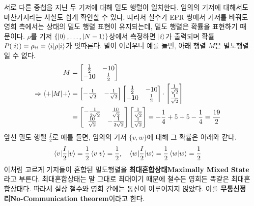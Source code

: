 \documentclass[a4paper,chapter,atbegshi]{oblivoir}
\begin{document}
서로 다른 중첩을 지닌 두 기저에 대해 밀도 행렬이 일치한다. 임의의
기저에 대해서도 마찬가지라는 사실도 쉽게 확인할 수 있다. 따라서 철수가
EPR 쌍에서 기저를 바꿔도 영희 측에서는 상태의 밀도 행렬 표현이 유지되는데,
밀도 행렬은 확률을 표현하기 때문이다. $\rho$를 기저 
$\{\ket0,\ldots,\ket{N-1}\}$상에서 측정하면 $\ket{i}$가
출력되며 확률 $P(\ket{i})=\rho_{ii}=\braket{i|\rho|i}$가 잇따른다. 말이 어려우니
예를 들면, 아래 행렬 $M$은 밀도행렬일 수 없다.
\begin{align*}
  M &= \begin{bmatrix}\frac{1}{2} &-10 \\ -10 &\frac{1}{2}\end{bmatrix}\\
  \Rightarrow\braket{+|M|+}&=
  \begin{bmatrix}-\frac{1}{\sqrt2}&-\frac{1}{\sqrt2}\end{bmatrix}
\begin{bmatrix}\frac{1}{2} &-10 \\ -10 &\frac{1}{2}\end{bmatrix}\cdot
\begin{bmatrix}\frac{1}{\sqrt2}\\\frac{1}{\sqrt2}\end{bmatrix}\\&=
  \begin{bmatrix}-\frac{1}{2\sqrt2}&\frac{10}{\sqrt2}\\
  \frac{10}{\sqrt2}&-\frac{1}{2\sqrt2}\end{bmatrix}
   \begin{bmatrix}\frac{1}{\sqrt2}\\\frac{1}{\sqrt2}\end{bmatrix}
   =-\frac{1}{4}+5+5-\frac{1}{4}=\frac{19}{2}
\end{align*}
앞선 밀도 행렬 $\frac{I}{2}$로 예를 들면, 임의의 기저 
$\{v,w\}$에 대해 그 확률은 아래와 같다.
\[
  \braket{v|\frac{I}{2}|v}=\frac{1}{2}\braket{v|v}=\frac{1}{2},\quad
  \braket{w|\frac{I}{2}|w}=\frac{1}{2}\braket{w|w}=\frac{1}{2}
\]
이처럼 고르게 기저들이 혼합된 밀도행렬을 \textbf{최대혼합상태\tiny Maximally Mixed
State}라고 부른다. 최대혼합상태는 말 그대로 최대이기 때문에 철수든 영희든
똑같은 최대혼합상태다. 따라서 실상 철수와 영희 간에는 통신이 이루어지지 않았다.
이를 \textbf{무통신정리\tiny No-Communication theorem}이라고 한다.
\end{document}
